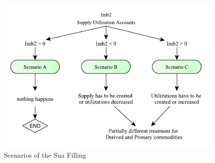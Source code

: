 \documentclass[]{article}
\begin{document}
\begin{figure}

{\centering \includegraphics[width=0.8\linewidth]{images/StandBal/05b_ScenariosFilling} 

}

\caption{\label{fig:f5}Scenarios of the Sua Filling}\label{fig:f5}
\end{figure}
\end{document}
